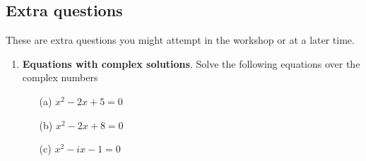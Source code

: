 \documentclass[11pt,a4paper]{scrartcl}
\begin{document}
\subsection*{Extra questions}

These are extra questions you might attempt in the workshop or at a
later time.

\begin{enumerate}
\item \textbf{Equations with complex solutions}. Solve the following equations over the complex numbers
  \begin{itemize}
  \item[(a)] $x^2 - 2x + 5 = 0$
  \item[(b)] $x^2-2x + 8 = 0$
  \item[(c)] $x^2 - ix - 1 = 0$
  \end{itemize}

\end{enumerate}
\end{document}
